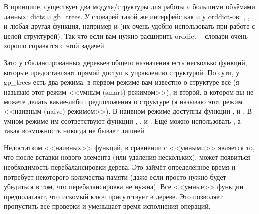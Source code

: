 В принципе, существует два модуля/структуры для работы с большими объёмами данных: \href{http://erldocs.com/R15B/stdlib/dict.html}{dicts} и \href{http://erldocs.com/R15B/stdlib/gb\_trees.html}{gb\_trees}.
У словарей такой же интерфейс как и у orddict\--ов: , , ,  и любая другая функция, например  и  (их очень удобно использовать при работе с целой структурой).
Так что если вам нужно расширить orddict \--- словари очень хорошо справятся с этой задачей..

Зато у сбалансированных деревьев общего назначения есть несколько функций, которые предоставляют прямой доступ к управлению структурой.
По сути, у gp\_trees есть два режима: в первом режиме вам известно о структуре всё (я называю этот режим <<умным (smart) режимом>>), и второй, в котором вы не можете делать какие\--либо предположения о структуре (я называю этот режим <<наивным (naive) режимом>>).
В наивном режиме доступны функции ,  и .
В умном режиме им соответствуют функции , ,  и .
Ещё можно использовать , а такая возможность никогда не бывает лишней.

Недостатком <<наивных>> функций, в сравнении с <<умными>> является то, что после вставки нового элемента (или удаления нескольких), может появиться необходимость перебалансировки дерева.
Это займёт определённое время и потребует некоторого количества памяти (даже если просто нужно будет убедиться в том, что перебалансировка не нужна).
Все <<умные>> функции предполагают, что искомый ключ присутствует в дереве.
Это позволяет пропустить все проверки и уменьшает время исполнения операций.

